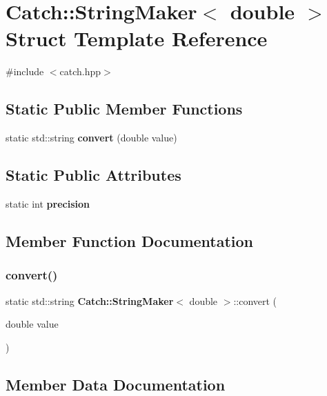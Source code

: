 \section{Catch\+::String\+Maker$<$ double $>$ Struct Template Reference}
\label{struct_catch_1_1_string_maker_3_01double_01_4}


{\ttfamily \#include $<$catch.\+hpp$>$}

\subsection*{Static Public Member Functions}
\begin{DoxyCompactItemize}
\item 
static std\+::string \textbf{ convert} (double value)
\end{DoxyCompactItemize}
\subsection*{Static Public Attributes}
\begin{DoxyCompactItemize}
\item 
static int \textbf{ precision}
\end{DoxyCompactItemize}


\subsection{Member Function Documentation}
\mbox{\label{struct_catch_1_1_string_maker_3_01double_01_4_acaa61529acad2462292c747d34e5f3d2}} 
\subsubsection{convert()}
{\footnotesize\ttfamily static std\+::string \textbf{ Catch\+::\+String\+Maker}$<$ double $>$\+::convert (\begin{DoxyParamCaption}\item[{double}]{value }\end{DoxyParamCaption})\hspace{0.3cm}{\ttfamily [static]}}



\subsection{Member Data Documentation}
\mbox{\label{struct_catch_1_1_string_maker_3_01double_01_4_a15fa2b093c532ece7f1d0c713ebaee67}} 
